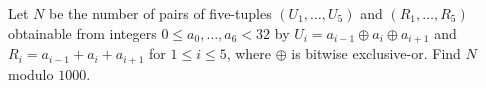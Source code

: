 Let $N$ be the number of pairs of five-tuples $(U_1,\ldots,U_5)$ and $(R_1,\ldots,R_5)$ obtainable from integers $0\le a_0,\ldots,a_6<32$ by $U_i=a_{i-1}\oplus a_i\oplus a_{i+1}$ and $R_i=a_{i-1}+a_i+a_{i+1}$ for $1\le i\le5$, where $\oplus$ is bitwise exclusive-or. Find $N$ modulo $1000$.
